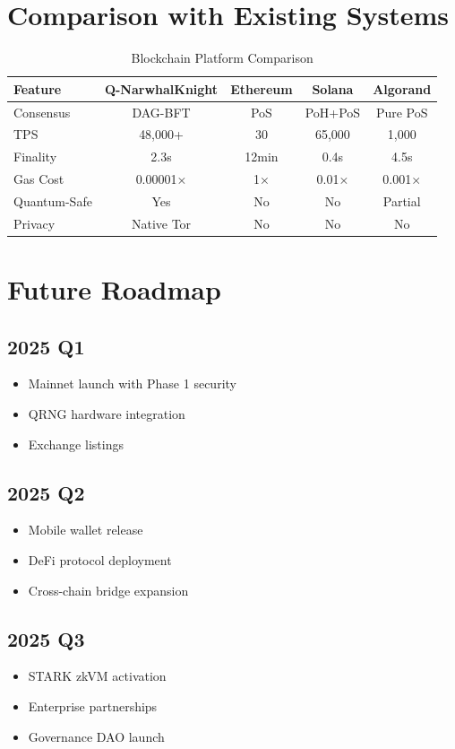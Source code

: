\documentclass[11pt,a4paper]{article}
\begin{document}
\section{Comparison with Existing Systems}

\begin{table}[h]
\centering
\small
\begin{tabular}{|l|c|c|c|c|}
\hline
\textbf{Feature} & \textbf{Q-NarwhalKnight} & \textbf{Ethereum} & \textbf{Solana} & \textbf{Algorand} \\
\hline
Consensus & DAG-BFT & PoS & PoH+PoS & Pure PoS \\
TPS & 48,000+ & 30 & 65,000 & 1,000 \\
Finality & 2.3s & 12min & 0.4s & 4.5s \\
Gas Cost & 0.00001× & 1× & 0.01× & 0.001× \\
Quantum-Safe & Yes & No & No & Partial \\
Privacy & Native Tor & No & No & No \\
\hline
\end{tabular}
\caption{Blockchain Platform Comparison}
\end{table}

\section{Future Roadmap}

\subsection{2025 Q1}
\begin{itemize}
    \item Mainnet launch with Phase 1 security
    \item QRNG hardware integration
    \item Exchange listings
\end{itemize}

\subsection{2025 Q2}
\begin{itemize}
    \item Mobile wallet release
    \item DeFi protocol deployment
    \item Cross-chain bridge expansion
\end{itemize}

\subsection{2025 Q3}
\begin{itemize}
    \item STARK zkVM activation
    \item Enterprise partnerships
    \item Governance DAO launch
\end{itemize}
\end{document}

